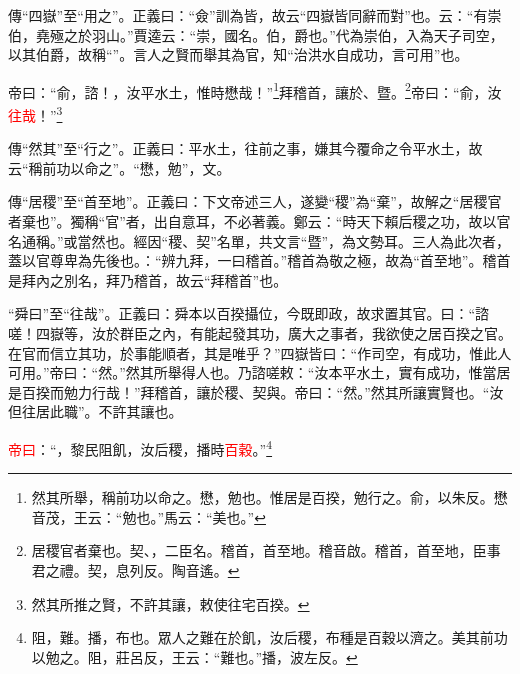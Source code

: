{\noindent\zhuan{}\fzbyks 傳“四嶽”至“用之”。正義曰：“僉”訓為皆，故云“四嶽皆同辭而對”也。云：“有崇伯，堯殛之於羽山。”賈逵云：“崇，國名。伯，爵也。”代為崇伯，入為天子司空，以其伯爵，故稱“”。言人之賢而舉其為官，知“治洪水自成功，言可用”也。 \par}

帝曰：“俞，諮！，汝平水土，惟時懋哉！”\footnote{然其所舉，稱前功以命之。懋，勉也。惟居是百揆，勉行之。俞，以朱反。懋音茂，王云：“勉也。”馬云：“美也。”}拜稽首，讓於、暨。\footnote{居稷官者棄也。契、，二臣名。稽首，首至地。稽音啟。稽首，首至地，臣事君之禮。契，息列反。陶音遙。}帝曰：“俞，汝\textcolor{red}{往哉}！”\footnote{然其所推之賢，不許其讓，敕使往宅百揆。}

{\noindent\zhuan{}\fzbyks 傳“然其”至“行之”。正義曰：平水土，往前之事，嫌其今覆命之令平水土，故云“稱前功以命之”。“懋，勉”，文。 \par}

{\noindent\zhuan{}\fzbyks 傳“居稷”至“首至地”。正義曰：下文帝述三人，遂變“稷”為“棄”，故解之“居稷官者棄也”。獨稱“官”者，出自意耳，不必著義。鄭云：“時天下賴后稷之功，故以官名通稱。”或當然也。經因“稷、契”名單，共文言“暨”，為文勢耳。三人為此次者，蓋以官尊卑為先後也。：“辨九拜，一曰稽首。”稽首為敬之極，故為“首至地”。稽首是拜內之別名，拜乃稽首，故云“拜稽首”也。 \par}

{\noindent\shu{}\fzkt “舜曰”至“往哉”。正義曰：舜本以百揆攝位，今既即政，故求置其官。曰：“諮嗟！四嶽等，汝於群臣之內，有能起發其功，廣大之事者，我欲使之居百揆之官。在官而信立其功，於事能順者，其是唯乎？”四嶽皆曰：“作司空，有成功，惟此人可用。”帝曰：“然。”然其所舉得人也。乃諮嗟敕：“汝本平水土，實有成功，惟當居是百揆而勉力行哉！”拜稽首，讓於稷、契與。帝曰：“然。”然其所讓實賢也。“汝但往居此職”。不許其讓也。 \par}

\textcolor{red}{帝曰}：“，黎民阻飢，汝后稷，播時\textcolor{red}{百穀}。”\footnote{阻，難。播，布也。眾人之難在於飢，汝后稷，布種是百穀以濟之。美其前功以勉之。阻，莊呂反，王云：“難也。”播，波左反。}

